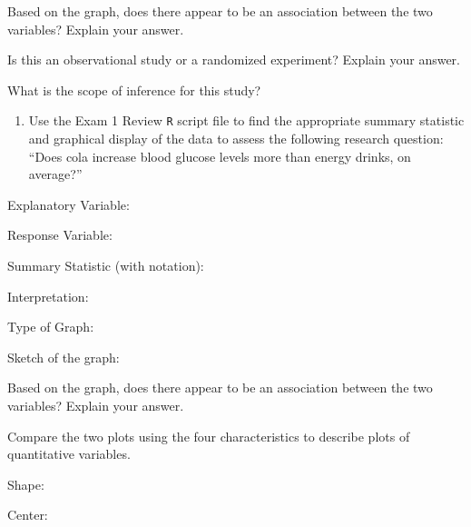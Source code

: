 \documentclass[
]{report}
\providecommand{\tightlist}{%
  \setlength{\itemsep}{0pt}\setlength{\parskip}{0pt}}
\newcommand{\rgi}{\hspace{24pt}}  %
\begin{document}
\vspace{2in}

\rgi Based on the graph, does there appear to be an association between the two variables? Explain your answer.

\vspace{0.5in}

\rgi Is this an observational study or a randomized experiment? Explain your answer.

\vspace{0.5in}

\rgi What is the scope of inference for this study?

\newpage

\begin{enumerate}
\def\labelenumi{\arabic{enumi}.}
\setcounter{enumi}{6}
\tightlist
\item
  Use the Exam 1 Review \texttt{R} script file to find the appropriate summary statistic and graphical display of the data to assess the following research question: ``Does cola increase blood glucose levels more than energy drinks, on average?''
\end{enumerate}

\rgi Explanatory Variable:

\rgi Response Variable:

\rgi Summary Statistic (with notation):

\rgi \rgi Interpretation:

\vspace{0.3in}

\rgi Type of Graph:

\vspace{0.3in}

\rgi Sketch of the graph:

\vspace{1.5in}

\rgi Based on the graph, does there appear to be an association between the two variables? Explain your answer.

\vspace{0.5in}

\rgi Compare the two plots using the four characteristics to describe plots of quantitative variables.

\rgi \rgi Shape:

\vspace{0.2in}

\rgi \rgi Center:

\vspace{0.2in}
\end{document}
